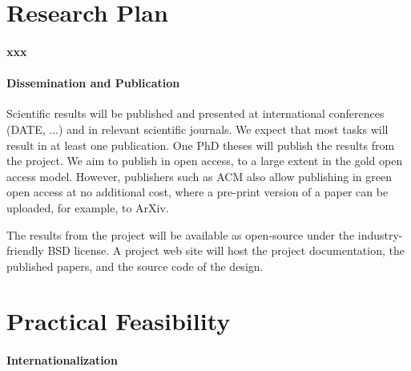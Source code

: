 \documentclass[fleqn,12pt]{article}
\begin{document}
\section{Research Plan}

\paragraph{xxx}



\paragraph*{Dissemination and Publication}

Scientific results will be published and presented at international
conferences (DATE, ...) and in relevant scientific journals.
We expect that most tasks will result in at least one publication.
One PhD theses will publish the results from the project.
We aim to publish in open access, to a large extent in the gold open access model.
However, publishers such as ACM also allow publishing in green open access
at no additional cost, where a pre-print version of a paper can be uploaded,
for example, to ArXiv.

The results from the project will be available as open-source under the
industry-friendly BSD license.
A project web site will host the project documentation, the published papers, and the
source code of the design.



\section{Practical Feasibility}


\paragraph*{Internationalization}
\end{document}
